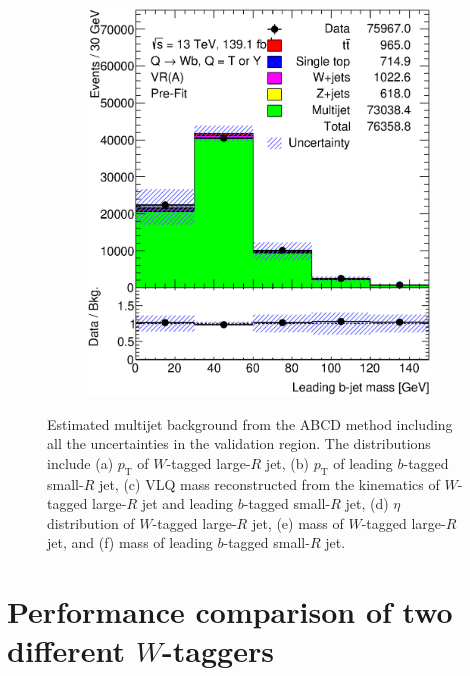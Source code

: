 \begin{figure}[hbt!]
\begin{subfigure}{.35\textwidth}
		\caption{}
		\label{fig:results:estimation:ljet_m}
	\end{subfigure}\hspace{0.6cm}
	\begin{subfigure}{.35\textwidth}
		\centering
		\includegraphics[width=\linewidth,height=\textheight,keepaspectratio]{VR_B_jet_m.eps}
		\caption{}
		\label{fig:results:estimation:jet_m}
	\end{subfigure}
	\caption{Estimated multijet background from the ABCD method including all the uncertainties in the validation region. The distributions include (a) $p_{\text{T}}$ of $W$-tagged large-$R$ jet, (b) $p_{\text{T}}$ of leading $b$-tagged small-$R$ jet, (c) VLQ mass reconstructed from the kinematics of $W$-tagged large-$R$ jet and leading $b$-tagged small-$R$ jet, (d) $\eta$ distribution of $W$-tagged large-$R$ jet, (e) mass of $W$-tagged large-$R$ jet, and (f) mass of leading $b$-tagged small-$R$ jet.}
	\label{fig:results:estimation}
\end{figure}


\section{Performance comparison of two different $W$-taggers}
\label{sec:results:taggers}

